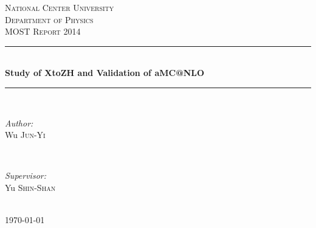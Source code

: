 \documentclass[12pt]{article} %
\begin{document}

\begin{titlepage}

  \newcommand{\HRule}{\rule{\linewidth}{0.5mm}} %

  \center %

  \textsc{\LARGE National Center University}\\[1.5cm] %
  \textsc{\Large Department of Physics}\\[0.5cm] %
  \textsc{\large MOST Report 2014}\\[0.5cm] %

  \HRule \\[0.4cm]
         { \huge \bfseries Study of XtoZH and Validation of aMC@NLO}\\[0.4cm] %
         \HRule \\[1.5cm]

         \begin{minipage}{0.4\textwidth}
           \begin{flushleft} \large
             \emph{Author:}\\
             Wu \textsc{Jun-Yi} %
           \end{flushleft}
         \end{minipage}
         ~
         \begin{minipage}{0.4\textwidth}
           \begin{flushright} \large
             \emph{Supervisor:} \\
             Yu \textsc{Shin-Shan} %
           \end{flushright}
         \end{minipage}\\[4cm]

         {\large \today}\\[3cm] %


         \vfill %

\end{titlepage}
\end{document}

